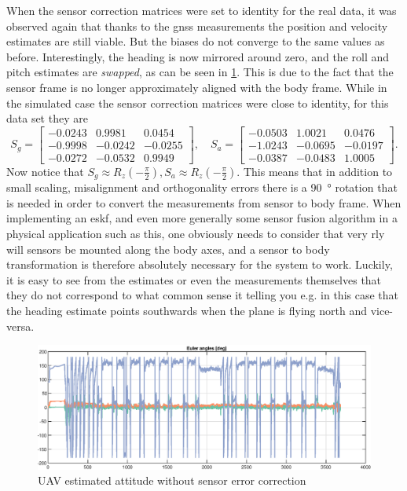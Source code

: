 When the sensor correction matrices were set to identity for the real data, it was observed again that thanks to the \acrshort{gnss} measurements the position and velocity estimates are still viable. But the biases do not converge to the same values as before. Interestingly, the heading is now mirrored around zero, and the roll and pitch estimates are \textit{swapped}, as can be seen in \cref{fig:ga_2_real_bad}. This is due to the fact that the sensor frame is no longer approximately aligned with the body frame. While in the simulated case the sensor correction matrices were close to identity, for this data set they are
\begin{equation}
    S_g = \begin{bmatrix}
        -0.0243 & 0.9981  & 0.0454 \\
        -0.9998 & -0.0242 & -0.0255 \\
        -0.0272 & -0.0532 & 0.9949
    \end{bmatrix}, \quad
    S_a = \begin{bmatrix}
        -0.0503 & 1.0021  & 0.0476 \\
        -1.0243 & -0.0695 & -0.0197 \\
        -0.0387 & -0.0483 & 1.0005
    \end{bmatrix}.
\end{equation}
Now notice that $S_g \approx R_z(-\frac{\pi}{2}), S_a \approx R_z(-\frac{\pi}{2})$. This means that in addition to small scaling, misalignment and orthogonality errors there is a \SI{90}{\degree} rotation that is needed in order to convert the measurements from sensor to body frame. When implementing an \acrshort{eskf}, and even more generally some sensor fusion algorithm in a physical application such as this, one obviously needs to consider that very rly will sensors be mounted along the body axes, and a sensor to body transformation is therefore absolutely necessary for the system to work. Luckily, it is easy to see from the estimates or even the measurements themselves that they do not correspond to what common sense it telling you e.g. in this case that the heading estimate points southwards when the plane is flying north and vice-versa. 

\begin{figure}[!htb]
    \centering
    \includegraphics[width=0.6\linewidth]{figures/ga_2/real_bad_heading.eps}
    \caption{UAV estimated attitude without sensor error correction}
    \label{fig:ga_2_real_bad}
\end{figure}

